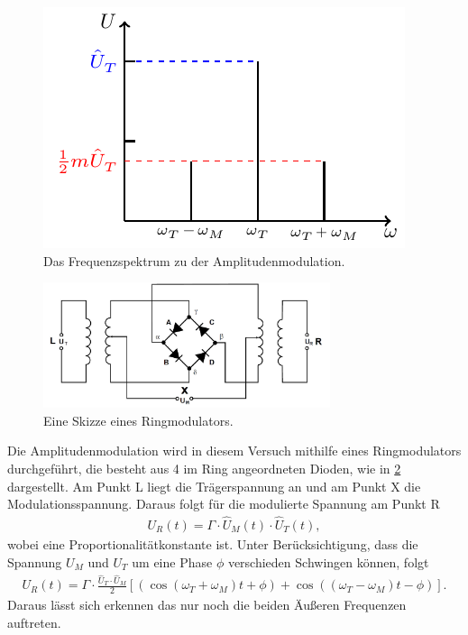 \begin{figure}
	\centering
	\includegraphics[width =\textwidth/2]{../Grafiken/tikz/tikz-Frequenzspektrum.pdf}
	\caption{Das Frequenzspektrum zu der Amplitudenmodulation.\label{fig:Frequenzspektrum} }
\end{figure}
\newpage
\begin{figure}
	\centering
	\includegraphics[width = 0.75\textwidth]{../Grafiken/Ringmodulator.pdf}
	\caption{Eine Skizze eines Ringmodulators.\cite{V59}\label{fig:Ringmodulator}}
\end{figure}
Die Amplitudenmodulation wird in diesem Versuch mithilfe eines Ringmodulators durchgeführt, die besteht aus 4 im Ring angeordneten Dioden, wie in \cref{fig:Ringmodulator} dargestellt.
Am Punkt L liegt die Trägerspannung an und am Punkt X die Modulationsspannung.
Daraus folgt für die modulierte Spannung am Punkt R
\begin{align}
	U_R(t)=\Gamma\cdot \hat U_M(t) \cdot\hat U_T(t),
\end{align}
wobei eine Proportionalitätkonstante ist. Unter Berücksichtigung, dass die Spannung $U_M$ und $U_T$ um eine Phase $\phi$ verschieden Schwingen können, folgt
\begin{align}
	U_R(t)=\Gamma\cdot \frac{\hat U_T\cdot\hat U_M}{2}\left[ \left(\cos\left(\omega_T+\omega_M\right)t+\phi\right) +\cos\left(\left(\omega_T-\omega_M\right)t-\phi\right) \right].
	\label{eq:amplituden_moduliert_ohne_traeger}
\end{align}
Daraus lässt sich erkennen das nur noch die beiden Äußeren Frequenzen auftreten.

